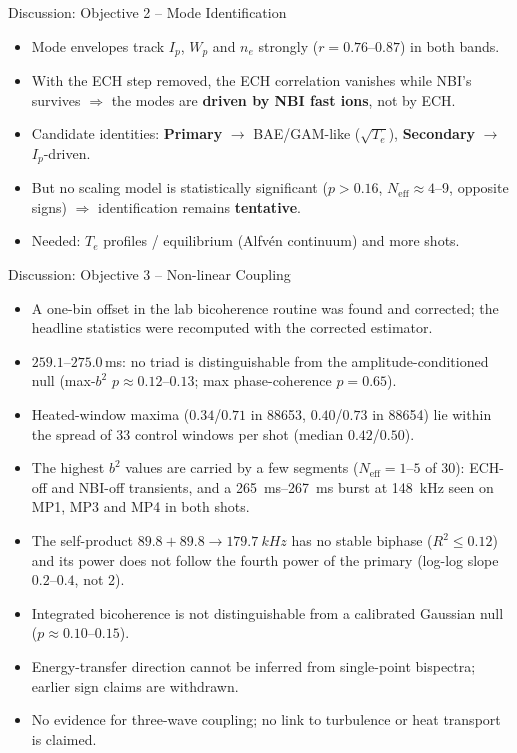 \documentclass[aspectratio=169,xcolor=table]{beamer}
\newcommand{\Prim}{\textcolor{primcol}{\textbf{Primary}}}
\newcommand{\Sec}{\textcolor{seccol}{\textbf{Secondary}}}
\begin{document}
\begin{frame}{Discussion: Objective 2 -- Mode Identification}
    \begin{itemize}[<+->]
        \item Mode envelopes track $I_p$, $W_p$ and $n_e$ strongly ($r=0.76$--$0.87$) in both bands.
        \item With the ECH step removed, the ECH correlation vanishes while NBI's survives
        $\Rightarrow$ the modes are \textbf{driven by NBI fast ions}, not by ECH.
        \item Candidate identities: \Prim{} $\rightarrow$ BAE/GAM-like ($\sqrt{T_e}$),
        \Sec{} $\rightarrow$ $I_p$-driven.
        \item But no scaling model is statistically significant ($p>0.16$, $N_{\text{eff}}\approx4$--9,
        opposite signs) $\Rightarrow$ identification remains \textbf{tentative}.
        \item Needed: $T_e$ profiles / equilibrium (Alfvén continuum) and more shots.
    \end{itemize}
\end{frame}

\begin{frame}{Discussion: Objective 3 -- Non-linear Coupling}
    \small
    \begin{itemize}[<+->]
        \item A one-bin offset in the lab bicoherence routine was found and corrected; the headline statistics were recomputed with the corrected estimator.
        \item $259.1$--$275.0$\,ms: no triad is distinguishable from the amplitude-conditioned null (max-$b^2$ $p\approx0.12$--$0.13$; max phase-coherence $p=0.65$).
        \item Heated-window maxima ($0.34$/$0.71$ in 88653, $0.40$/$0.73$ in 88654) lie within the spread of 33 control windows per shot (median $0.42$/$0.50$).
        \item The highest $b^2$ values are carried by a few segments ($N_{\text{eff}}=1$--$5$ of 30): ECH-off and NBI-off transients, and a \SIrange{265}{267}{ms} burst at \SI{148}{kHz} seen on MP1, MP3 and MP4 in both shots.
        \item The self-product $89.8+89.8\to\SI{179.7}{kHz}$ has no stable biphase ($R^2\le0.12$) and its power does not follow the fourth power of the primary (log-log slope $0.2$--$0.4$, not $2$).
        \item Integrated bicoherence is not distinguishable from a calibrated Gaussian null ($p\approx0.10$--$0.15$).
        \item Energy-transfer direction cannot be inferred from single-point bispectra; earlier sign claims are withdrawn.
        \item No evidence for three-wave coupling; no link to turbulence or heat transport is claimed.
    \end{itemize}
\end{frame}
\end{document}

